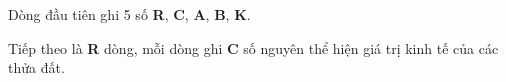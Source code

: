 Dòng đầu tiên ghi 5 số \textbf{R}, \textbf{C}, \textbf{A}, \textbf{B}, \textbf{K}.

Tiếp theo là \textbf{R} dòng, mỗi dòng ghi \textbf{C} số nguyên thể hiện giá trị kinh tế của các thửa đất.